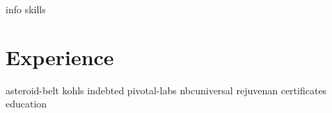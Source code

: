 \documentclass[letterpaper,11pt]{article}
\begin{document}
{info}
{skills}
\section{Experience}
{asteroid-belt}
{kohls}
{indebted}
{pivotal-labs}
{nbcuniversal}
{rejuvenan}
{certificates}
{education}
\end{document}
